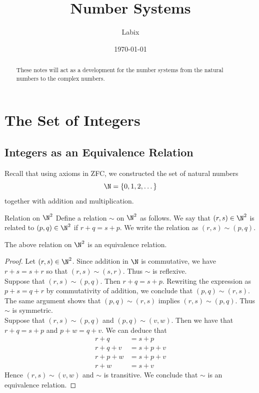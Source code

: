 \documentclass[a4paper]{article}
\title{Number Systems}
\author{Labix}
\date{\today}
\begin{document}
\maketitle
\begin{abstract}
These notes will act as a development for the number systems from the natural numbers to the complex numbers. 
\end{abstract}
\pagebreak
\tableofcontents

\pagebreak
\section{The Set of Integers}
\subsection{Integers as an Equivalence Relation}
Recall that using axioms in ZFC, we constructed the set of natural numbers $$\N=\{0,1,2,\dots\}$$ together with addition and multiplication. 

\begin{defn}{Relation on $\N^2$}{} Define a relation $\sim$ on $\N^2$ as follows. We say that $(r,s)\in\N^2$ is related to $(p,q)\in\N^2$ if $r+q=s+p$. We write the relation as $(r,s)\sim(p,q)$. 
\end{defn}

\begin{lmm}{}{} The above relation on $\N^2$ is an equivalence relation. 
\begin{proof}
Let $(r,s)\in\N^2$. Since addition in $\N$ is commutative, we have $r+s=s+r$ so that $(r,s)\sim(s,r)$. Thus $\sim$ is reflexive. \\

Suppose that $(r,s)\sim(p,q)$. Then $r+q=s+p$. Rewriting the expression as $p+s=q+r$ by commutativity of addition, we conclude that $(p,q)\sim(r,s)$. The same argument shows that $(p,q)\sim(r,s)$ implies $(r,s)\sim(p,q)$. Thus $\sim$ is symmetric. \\

Suppose that $(r,s)\sim(p,q)$ and $(p,q)\sim(v,w)$. Then we have that $r+q=s+p$ and $p+w=q+v$. We can deduce that 
\begin{align*}
r+q&=s+p\\
r+q+v&=s+p+v\\
r+p+w&=s+p+v\\
r+w&=s+v
\end{align*}
Hence $(r,s)\sim(v,w)$ and $\sim$ is transitive. We conclude that $\sim$ is an equivalence relation. 
\end{proof}
\end{lmm}
\end{document}

